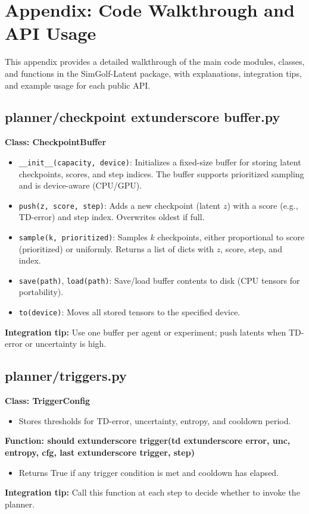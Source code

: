 \documentclass{article}
\begin{document}
\section{Appendix: Code Walkthrough and API Usage}
This appendix provides a detailed walkthrough of the main code modules, classes, and functions in the SimGolf-Latent package, with explanations, integration tips, and example usage for each public API.

\subsection{planner/checkpoint	extunderscore buffer.py}
\textbf{Class: CheckpointBuffer}
\begin{itemize}
\item \texttt{__init__(capacity, device)}: Initializes a fixed-size buffer for storing latent checkpoints, scores, and step indices. The buffer supports prioritized sampling and is device-aware (CPU/GPU).
\item \texttt{push(z, score, step)}: Adds a new checkpoint (latent $z$) with a score (e.g., TD-error) and step index. Overwrites oldest if full.
\item \texttt{sample(k, prioritized)}: Samples $k$ checkpoints, either proportional to score (prioritized) or uniformly. Returns a list of dicts with $z$, score, step, and index.
\item \texttt{save(path)}, \texttt{load(path)}: Save/load buffer contents to disk (CPU tensors for portability).
\item \texttt{to(device)}: Moves all stored tensors to the specified device.
\end{itemize}
\textbf{Integration tip:} Use one buffer per agent or experiment; push latents when TD-error or uncertainty is high.

\subsection{planner/triggers.py}
\textbf{Class: TriggerConfig}
\begin{itemize}
\item Stores thresholds for TD-error, uncertainty, entropy, and cooldown period.
\end{itemize}
\textbf{Function: should	extunderscore trigger(td	extunderscore error, unc, entropy, cfg, last	extunderscore trigger, step)}
\begin{itemize}
\item Returns True if any trigger condition is met and cooldown has elapsed.
\end{itemize}
\textbf{Integration tip:} Call this function at each step to decide whether to invoke the planner.
\end{document}
